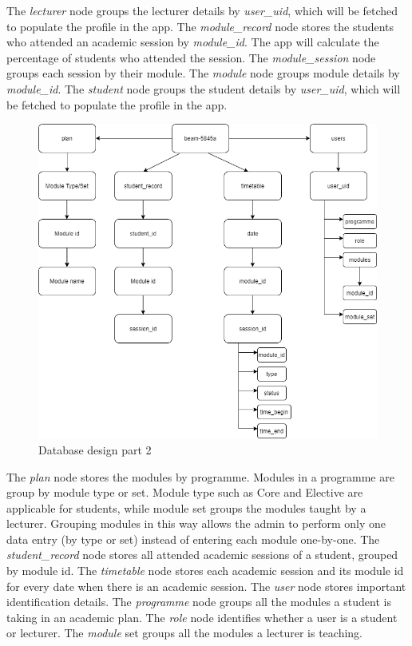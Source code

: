 \documentclass[../report.tex]{subfiles}
\begin{document}
The \textit{lecturer} node groups the lecturer details by \textit{user\_uid}, which will be fetched to populate the profile in the app. The \textit{module\_record} node stores the students who attended an academic session by \textit{module\_id}. The app will calculate the percentage of students who attended the session. The \textit{module\_session} node groups each session by their module. The \textit{module} node groups module details by \textit{module\_id}. The \textit{student} node groups the student details by \textit{user\_uid}, which will be fetched to populate the profile in the app.

\begin{figure}[H]
\centering
\includegraphics[width=\textwidth]{./images/05/08-database-2.png}
\caption{Database design part 2}
\label{fig:database-design-2}
\end{figure}

The \textit{plan} node stores the modules by programme. Modules in a programme are group by module type or set. Module type such as Core and Elective are applicable for students, while module set groups the modules taught by a lecturer. Grouping modules in this way allows the admin to perform only one data entry (by type or set) instead of entering each module one-by-one. The \textit{student\_record} node stores all attended academic sessions of a student, grouped by module id. The \textit{timetable} node stores each academic session and its module id for every date when there is an academic session. The \textit{user} node stores important identification details. The \textit{programme} node groups all the modules a student is taking in an academic plan. The \textit{role} node identifies whether a user is a student or lecturer. The \textit{module} set groups all the modules a lecturer is teaching. 
\end{document}

